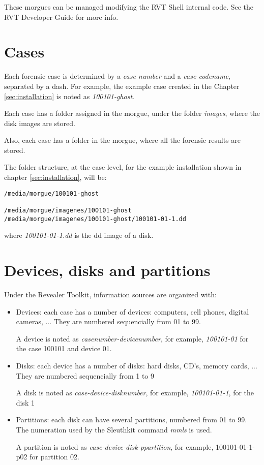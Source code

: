 \documentclass[a4paper,11pt,oneside]{report}
\begin{document}
These morgues can be managed modifying the RVT Shell internal code. See the RVT Developer Guide for more info.


\section{Cases}

Each forensic case is determined by a \emph{case number} and a \emph{case codename}, separated by a dash. For example, the example case created in the Chapter \ref{sec:installation} is noted as \emph{100101-ghost}.

Each case has a folder assigned in the morgue, under the folder \emph{images}, where the disk images are stored.

Also, each case has a folder in the morgue, where all the forensic results are stored.

The folder structure, at the case level, for the example installation shown in chapter \ref{sec:installation}, will be:

\begin{verbatim}
/media/morgue/100101-ghost

/media/morgue/imagenes/100101-ghost
/media/morgue/imagenes/100101-ghost/100101-01-1.dd
\end{verbatim}

where \emph{100101-01-1.dd} is the dd image of a disk.


\section{Devices, disks and partitions}

Under the Revealer Toolkit, information sources are organized with:

\begin{itemize}
\item Devices: each case has a number of devices: computers, cell phones, digital cameras, ...   They are numbered sequencially from 01 to 99. 

A device is noted as \emph{casenumber-devicenumber}, for example, \emph{100101-01} for the case 100101 and device 01.

\item Disks: each device has a number of disks: hard disks, CD's, memory cards, ... They are numbered sequencially from 1 to 9

A disk is noted as \emph{case-device-disknumber}, for example, \emph{100101-01-1}, for the disk 1

\item Partitions:  each disk can have several partitions, numbered from 01 to 99. The numeration used by the Sleuthkit command \emph{mmls} is used.

A partition is noted as \emph{case-device-disk-ppartition}, for example, 100101-01-1-p02 for partition 02.
\end{itemize}
\end{document}
